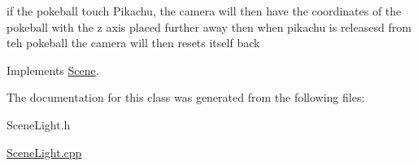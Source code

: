 if the pokeball touch Pikachu, the camera will then have the coordinates of the pokeball with the z axis placed further away then when pikachu is releasesd from teh pokeball the camera will then resets itself back

Implements \hyperlink{class_scene}{Scene}.



The documentation for this class was generated from the following files\+:\begin{DoxyCompactItemize}
\item 
Scene\+Light.\+h\item 
\hyperlink{_scene_light_8cpp}{Scene\+Light.\+cpp}\end{DoxyCompactItemize}
